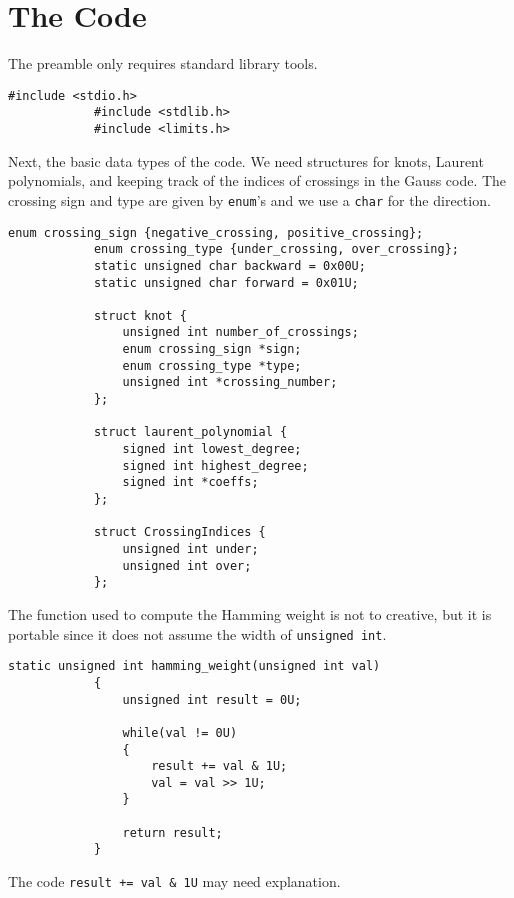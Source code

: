 \documentclass{article}
\theoremstyle{plain}
\begin{document}
    \section{The Code}
        The preamble only requires standard library tools.
        \begin{lstlisting}[style=CStyle, gobble=12]
            #include <stdio.h>
            #include <stdlib.h>
            #include <limits.h>
        \end{lstlisting}
        Next, the basic data types of the code. We need structures for knots,
        Laurent polynomials, and keeping track of the indices of crossings in
        the Gauss code. The crossing sign and type are given
        by \texttt{enum}'s and we use a \texttt{char} for the direction.
        \begin{lstlisting}[style=CStyle, gobble=12]
            enum crossing_sign {negative_crossing, positive_crossing};
            enum crossing_type {under_crossing, over_crossing};
            static unsigned char backward = 0x00U;
            static unsigned char forward = 0x01U;

            struct knot {
                unsigned int number_of_crossings;
                enum crossing_sign *sign;
                enum crossing_type *type;
                unsigned int *crossing_number;
            };

            struct laurent_polynomial {
                signed int lowest_degree;
                signed int highest_degree;
                signed int *coeffs;
            };

            struct CrossingIndices {
                unsigned int under;
                unsigned int over;
            };
        \end{lstlisting}
        The function used to compute the Hamming weight is not to creative,
        but it is portable since it does not assume the width of
        \texttt{unsigned int}.
        \begin{lstlisting}[style=CStyle, gobble=12]
            static unsigned int hamming_weight(unsigned int val)
            {
                unsigned int result = 0U;

                while(val != 0U)
                {
                    result += val & 1U;
                    val = val >> 1U;
                }

                return result;
            }
        \end{lstlisting}
        The code \texttt{result += val \& 1U} may need explanation.
\end{document}
